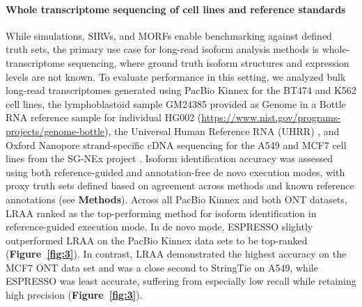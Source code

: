 \label{fig:2}

\paragraph{Whole transcriptome sequencing of cell lines and reference standards}\label{whole-transcriptome-sequencing-of-cell-lines-and-reference-standards}

While simulations, SIRVs, and MORFs enable benchmarking against defined truth sets, the primary use case for long-read isoform analysis methods is whole-transcriptome sequencing, where ground truth isoform structures and expression levels are not known. To evaluate performance in this setting, we analyzed bulk long-read transcriptomes generated using PacBio Kinnex for the BT474 and K562 cell lines, the lymphoblastoid sample GM24385 provided as Genome in a Bottle RNA reference sample for individual HG002 (\url{https://www.nist.gov/programs-projects/genome-bottle}), the Universal Human Reference RNA (UHRR) \citep{xu2014}, and Oxford Nanopore strand-specific cDNA sequencing for the A549 and MCF7 cell lines from the SG-NEx project \citep{chen2025}. Isoform identification accuracy was assessed using both reference-guided and annotation-free de novo execution modes, with proxy truth sets defined based on agreement across methods and known reference annotations (see \textbf{Methods}). Across all PacBio Kinnex and both ONT datasets, LRAA ranked as the top-performing method for isoform identification in reference-guided execution mode. In de novo mode, ESPRESSO slightly outperformed LRAA on the PacBio Kinnex data sets to be top-ranked (\textbf{Figure~\ref{fig:3}}). In contrast, LRAA demonstrated the highest accuracy on the MCF7 ONT data set and was a close second to StringTie on A549, while ESPRESSO was least accurate, suffering from especially low recall while retaining high precision (\textbf{Figure~\ref{fig:3}}).

